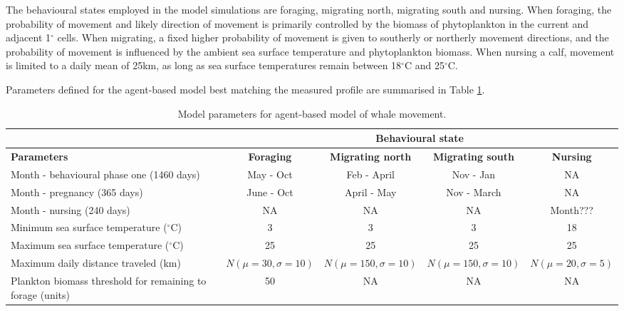 \documentclass[a4paper,12pt]{article}
\begin{document}
The behavioural states employed in the model simulations are foraging, migrating north, migrating south and nursing. When foraging, the probability of movement and likely direction of movement is primarily controlled by the biomass of phytoplankton in the current and adjacent 1$^{\circ}$ cells. When migrating, a fixed higher probability of movement is given to southerly or northerly movement directions, and the probability of movement is influenced by the ambient sea surface temperature and phytoplankton biomass. When nursing a calf, movement is limited to a daily mean of 25km, as long as sea surface temperatures remain between 18$^{\circ}$C and 25$^{\circ}$C.
 
Parameters defined for the agent-based model best matching the measured profile are summarised in Table \ref{tables1}.

\newpage

\begin{landscape}

\centering
\begin{table}
  \begin{tabular}{|p{5cm}|c|c|c|c|} 
    \hline
    & \multicolumn{4}{|c|}{\textbf{Behavioural state}} \\
    \hline
    \textbf{Parameters} & \textbf{Foraging} & \textbf{Migrating north} & \textbf{Migrating south} & \textbf{Nursing}\\
    \hline
    Month - behavioural phase one (1460 days) & May - Oct & Feb - April & Nov - Jan & NA\\
    \hline
    Month - pregnancy (365 days) & June - Oct & April - May & Nov - March & NA\\
    \hline
    Month - nursing (240 days) & NA & NA & NA & Month???\\
    \hline
    Minimum sea surface temperature ($^{\circ}$C) & 3 & 3 & 3 & 18\\
    \hline
    Maximum sea surface temperature ($^{\circ}$C) & 25 & 25 & 25 & 25\\
    \hline
    Maximum daily distance traveled (km) & $N(\mu=30, \sigma=10)$ & $N(\mu=150, \sigma=10)$ & $N(\mu=150, \sigma=10)$ & $N(\mu=20, \sigma=5)$\\
    \hline
    Plankton biomass threshold for remaining to forage (units) & 50 & NA & NA & NA\\
    \hline
  \end{tabular}
  \caption{Model parameters for agent-based model of whale movement.}
  \label{tables1}
\end{table}

\end{landscape}
 
\newpage


\end{document}
